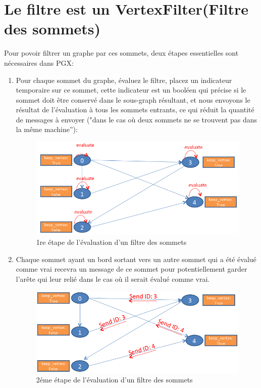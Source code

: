 \section{Le filtre est un VertexFilter(Filtre des sommets)}
Pour povoir filtrer un graphe par ces sommets, deux étapes essentielles sont nécessaires dans PGX:

\begin{enumerate}[label=\arabic*)]
\item  Pour chaque sommet du graphe, évaluez le filtre, placez un indicateur temporaire sur ce sommet, cette indicateur est un booléen qui précise si le sommet doit être conservé dans le sous-graph résultant, et nous envoyons le résultat de l'évaluation à tous les sommets entrants, ce qui réduit la quantité de messages à envoyer ("dans le cas où deux sommets ne se trouvent pas dans la même machine”):
\begin{figure}[H]  
  \centering
    \includegraphics[width=1\textwidth]{chapitre3/Figures/VertexFilter1.png}
  \caption{1re étape de l'évaluation d'un filtre des sommets}
\end{figure}

\item  Chaque sommet ayant un bord sortant vers un autre sommet qui a été évalué comme vrai recevra un message de ce sommet pour potentiellement garder l'arête qui leur relié dans le cas où il serait évalué comme vrai.
\begin{figure}[H]  
  \centering
    \includegraphics[width=1\textwidth]{chapitre3/Figures/VertexFilter2.png}
  \caption{2éme étape de l'évaluation d'un filtre des sommets}
\end{figure}
\end{enumerate}

